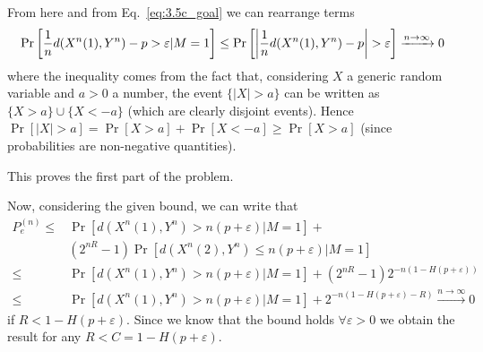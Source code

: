 From here and from Eq.~\eqref{eq:3.5c_goal} we can rearrange terms
%
\begin{equation}
\Pr \qty[ \frac{1}{n} d(X^n(1),Y^n) - p > \varepsilon |M=1] \leq \Pr \qty[ \qty| \frac{1}{n} d(X^n(1),Y^n) - p| > \varepsilon] \xrightarrow{n\rightarrow \infty} 0
\end{equation}
%
where the inequality comes from the fact that, considering $X$ a generic random variable and $a>0$ a number, the event $\{|X|>a\}$ can be written as $\{X>a\} \cup \{X<-a\}$ (which are clearly disjoint events). Hence $\Pr[|X|>a] = \Pr[X>a] + \Pr[X<-a] \geq \Pr[X>a]$ (since probabilities are non-negative quantities).

This proves the first part of the problem.

Now, considering the given bound, we can write that
%
\begin{equation}
\begin{split}
P_e^{(n)} \leq& \Pr[d(X^n(1),Y^n)>n(p+\varepsilon) | M=1] +\\
	&(2^{nR}-1) \Pr[d(X^n(2),Y^n) \leq n(p+\varepsilon) | M=1] \\
\leq& \Pr[d(X^n(1),Y^n)>n(p+\varepsilon) | M=1] + (2^{nR}-1)2^{-n(1-H(p+\varepsilon))}\\
\leq& \Pr[d(X^n(1),Y^n)>n(p+\varepsilon) | M=1] + 2^{-n(1-H(p+\varepsilon)-R)}
\xrightarrow{n\rightarrow \infty} 0
\end{split}
\end{equation}
%
if $R<1-H(p+\varepsilon)$. Since we know that the bound holds $\forall \varepsilon>0$ we obtain the result for any $R<C=1-H(p+\varepsilon)$.

